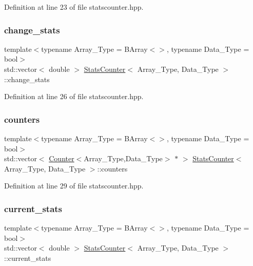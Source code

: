 Definition at line 23 of file statscounter.\+hpp.

\mbox{\label{class_stats_counter_a42c926799d8cb0abc6f5a1cfbc073f69}} 
\subsubsection{\texorpdfstring{change\+\_\+stats}{change\_stats}}
{\footnotesize\ttfamily template$<$typename Array\+\_\+\+Type = B\+Array$<$$>$, typename Data\+\_\+\+Type = bool$>$ \\
std\+::vector$<$ double $>$ \hyperlink{class_stats_counter}{Stats\+Counter}$<$ Array\+\_\+\+Type, Data\+\_\+\+Type $>$\+::change\+\_\+stats}



Definition at line 26 of file statscounter.\+hpp.

\mbox{\label{class_stats_counter_ab81464f54ee44deedf3fb1f16f9b87c5}} 
\subsubsection{\texorpdfstring{counters}{counters}}
{\footnotesize\ttfamily template$<$typename Array\+\_\+\+Type = B\+Array$<$$>$, typename Data\+\_\+\+Type = bool$>$ \\
std\+::vector$<$ \hyperlink{class_counter}{Counter}$<$Array\+\_\+\+Type,Data\+\_\+\+Type$>$ $\ast$ $>$ \hyperlink{class_stats_counter}{Stats\+Counter}$<$ Array\+\_\+\+Type, Data\+\_\+\+Type $>$\+::counters}



Definition at line 29 of file statscounter.\+hpp.

\mbox{\label{class_stats_counter_af98192f893280a2681a59f4b73051ca3}} 
\subsubsection{\texorpdfstring{current\+\_\+stats}{current\_stats}}
{\footnotesize\ttfamily template$<$typename Array\+\_\+\+Type = B\+Array$<$$>$, typename Data\+\_\+\+Type = bool$>$ \\
std\+::vector$<$ double $>$ \hyperlink{class_stats_counter}{Stats\+Counter}$<$ Array\+\_\+\+Type, Data\+\_\+\+Type $>$\+::current\+\_\+stats}



